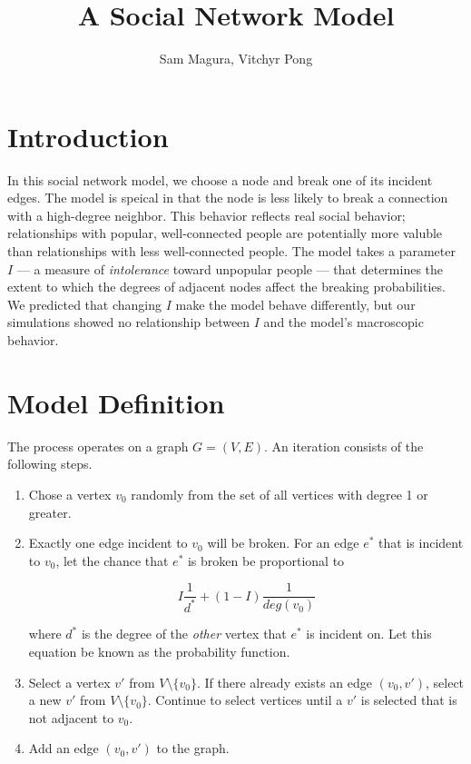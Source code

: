 \documentclass[a4paper,10pt]{article}
\title{A Social Network Model}
\author{Sam Magura, Vitchyr Pong}
\begin{document}
\maketitle

\section{Introduction}

In this social network model, we choose a node and break one of its incident edges. The model is speical in that the node is less likely to break a connection with a high-degree neighbor. This behavior reflects real social behavior; relationships with popular, well-connected people are potentially more valuble than relationships with less well-connected people. The model takes a parameter $I$ --- a measure of \emph{intolerance} toward unpopular people --- that determines the extent to which the degrees of adjacent nodes affect the breaking probabilities. We predicted that changing $I$ make the model behave differently, but our simulations showed no relationship between $I$ and the model's macroscopic behavior. 

\section{Model Definition}

The process operates on a graph $G = (V, E)$. An iteration consists of the following steps. 

\begin{enumerate}
 \item Chose a vertex $v_0$ randomly from the set of all vertices with degree 1 or greater. 
 \item Exactly one edge incident to $v_0$ will be broken. For an edge $e^*$ that is incident to $v_0$, let the chance that $e^*$ is broken be proportional to

 \begin{equation}
\label{eqn:pr-function}
  I \frac{1}{d^*} + (1 - I)\frac{1}{deg(v_0)}
 \end{equation}

where $d^*$ is the degree of the \emph{other} vertex that $e^*$ is incident on. Let this equation be known as the probability function. 

 \item Select a vertex $v'$ from $V \setminus \{v_0\}$. If there already exists an edge $(v_0, v')$, select a new $v'$ from $V \setminus \{v_0\}$. Continue to select vertices until a $v'$ is selected that is not adjacent to $v_0$.

 \item Add an edge $(v_0, v')$ to the graph. 

\end{enumerate}
\end{document}
